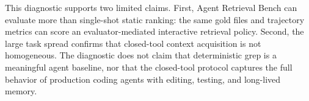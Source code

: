 \documentclass[11pt]{article}
\newcommand{\arb}{Agent Retrieval Bench}
\begin{document}
This diagnostic supports two limited claims. First, \arb{} can evaluate more than single-shot static ranking: the same gold files and trajectory metrics can score an evaluator-mediated interactive retrieval policy. Second, the large task spread confirms that closed-tool context acquisition is not homogeneous. The diagnostic does not claim that deterministic grep is a meaningful agent baseline, nor that the closed-tool protocol captures the full behavior of production coding agents with editing, testing, and long-lived memory.



\end{document}
